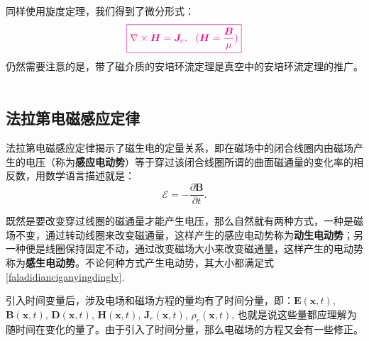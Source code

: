 \documentclass[10pt,reqno, final]{ctexart}
\begin{document}
同样使用旋度定理，我们得到了微分形式：
\begin{equation}\label{jiezhicichanghuanludingli}
\color{magenta}\boxed{\nabla\times\bm{H} = \bm{J}_e,\ \ (\bm{H}=\frac{\bm{B}}{\mu})}
\end{equation}
仍然需要注意的是，带了磁介质的安培环流定理是真空中的安培环流定理的推广。
\\ \hspace*{\fill} \\
{}

\subsection{法拉第电磁感应定律} 法拉第电磁感应定律揭示了磁生电的定量关系，即在磁场中的闭合线圈内由磁场产生的电压（称为\textbf{感应电动势}）等于穿过该闭合线圈所谓的曲面磁通量的变化率的相反数，用数学语言描述就是：
\begin{equation}\label{faladidianciganyingdinglv}
\mathscr{E}=-\frac{\partial\bm{B}}{\partial t}.
\end{equation}

既然是要改变穿过线圈的磁通量才能产生电压，那么自然就有两种方式，一种是磁场不变，通过转动线圈来改变磁通量，这样产生的感应电动势称为\textbf{动生电动势}；另一种便是线圈保持固定不动，通过改变磁场大小来改变磁通量，这样产生的电动势称为\textbf{感生电动势}。不论何种方式产生电动势，其大小都满足式\eqref{faladidianciganyingdinglv}.

引入时间变量后，涉及电场和磁场方程的量均有了时间分量，即：$\bm{E}(\bm{x},t)$, $\bm{B}(\bm{x},t)$, $\bm{D}(\bm{x},t)$,  $\bm{H}(\bm{x},t)$, $\bm{J}_e(\bm{x},t)$, $\rho_e(\bm{x},t)$, 也就是说这些量都应理解为随时间在变化的量了。由于引入了时间分量，那么电磁场的方程又会有一些修正。
\end{document}
